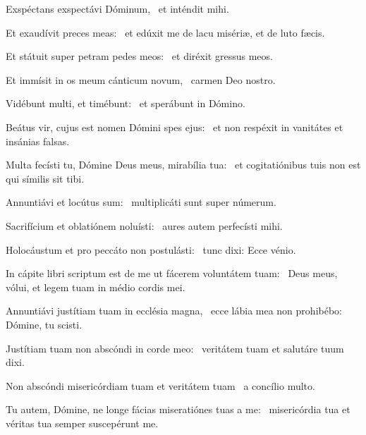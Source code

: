 \item Exspéctans exspectávi Dóminum,~\psstar{} et inténdit mihi.

\item Et exaudívit preces meas:~\psstar{} et edúxit me de lacu misériæ, et de luto fæcis.

\item Et státuit super petram pedes meos:~\psstar{} et diréxit gressus meos.

\item Et immísit in os meum cánticum novum,~\psstar{} carmen Deo nostro.

\item Vidébunt multi, et timébunt:~\psstar{} et sperábunt in Dómino.

\item Beátus vir, cujus est nomen Dómini spes ejus:~\psstar{} et non respéxit in vanitátes et insánias falsas.

\item Multa fecísti tu, Dómine Deus meus, mirabília tua:~\psstar{} et cogitatiónibus tuis non est qui símilis sit tibi.

\item Annuntiávi et locútus sum:~\psstar{} multiplicáti sunt super númerum.

\item Sacrifícium et oblatiónem noluísti:~\psstar{} aures autem perfecísti mihi.

\item Holocáustum et pro peccáto non postulásti:~\psstar{} tunc dixi: Ecce vénio.

\item In cápite libri scriptum est de me ut fácerem voluntátem tuam:~\psstar{} Deus meus, vólui, et legem tuam in médio cordis mei.

\item Annuntiávi justítiam tuam in ecclésia magna,~\psstar{} ecce lábia mea non prohibébo: Dómine, tu scisti.

\item Justítiam tuam non abscóndi in corde meo:~\psstar{} veritátem tuam et salutáre tuum dixi.

\item Non abscóndi misericórdiam tuam et veritátem tuam~\psstar{} a concílio multo.

\item Tu autem, Dómine, ne longe fácias miseratiónes tuas a me:~\psstar{} misericórdia tua et véritas tua semper suscepérunt me.

